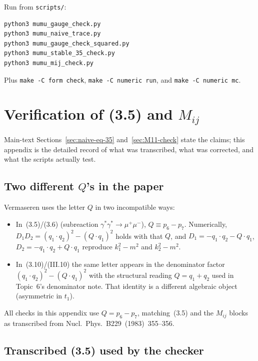 \documentclass[11pt]{article}
\begin{document}
\noindent
Run from \texttt{scripts/}:
\begin{verbatim}
python3 mumu_gauge_check.py
python3 mumu_naive_trace.py
python3 mumu_gauge_check_squared.py
python3 mumu_stable_35_check.py
python3 mumu_mij_check.py
\end{verbatim}
\noindent
Plus \texttt{make -C form check}, \texttt{make -C numeric run}, and
\texttt{make -C numeric mc}.

\section{Verification of (3.5) and $M_{ij}$}
\label{app:verify}

Main-text Sections~\ref{sec:naive-eq-35} and~\ref{sec:M11-check} state the
claims; this appendix is the detailed record of what was transcribed,
what was corrected, and what the scripts actually test.

\subsection{Two different $Q$'s in the paper}
\label{app:Q-convention}

Vermaseren uses the letter $Q$ in two incompatible ways:
\begin{itemize}
  \item In~(3.5)/(3.6) (subreaction $\gamma^*\gamma^*\to\mu^+\mu^-$),
    $Q\equiv p_6-p_7$. Numerically,
    $D_1 D_2=(q_1{\cdot}q_2)^2-(Q{\cdot}q_1)^2$ holds with that $Q$, and
    $D_1=-q_1{\cdot}q_2-Q{\cdot}q_1$, $D_2=-q_1{\cdot}q_2+Q{\cdot}q_1$
    reproduce $k_1^2-m^2$ and $k_2^2-m^2$.
  \item In~(3.10)/(III.10) the same letter appears in the denominator
    factor $(q_1{\cdot}q_2)^2-(Q{\cdot}q_1)^2$ with the structural reading
    $Q=q_1+q_2$ used in Topic~6's denominator note. That identity is a
    different algebraic object (asymmetric in $t_1$).
\end{itemize}
All checks in this appendix use $Q=p_6-p_7$, matching~(3.5) and the
$M_{ij}$ blocks as transcribed from Nucl.\ Phys.\ B229~(1983)~355--356.

\subsection{Transcribed (3.5) used by the checker}
\label{app:eq35-formula}
\end{document}
